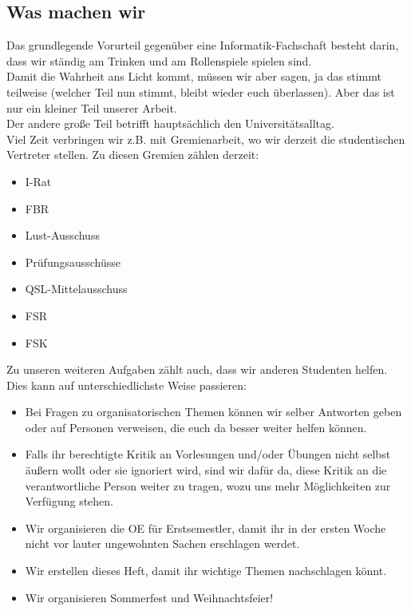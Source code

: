 \documentclass[12pt,a4paper]{scrartcl}
\begin{document}
	\subsection{Was machen wir}
		Das grundlegende Vorurteil gegenüber eine Informatik-Fachschaft besteht darin, dass wir ständig am Trinken und am Rollenspiele spielen sind. \\
		Damit die Wahrheit ans Licht kommt, müssen wir aber sagen, ja das stimmt teilweise (welcher Teil nun stimmt, bleibt wieder euch überlassen). Aber das ist nur ein kleiner Teil unserer Arbeit.\\
		Der andere große Teil betrifft hauptsächlich den Universitätsalltag.\\ Viel Zeit verbringen wir z.B. mit Gremienarbeit, wo wir derzeit die studentischen Vertreter stellen. Zu diesen Gremien zählen derzeit:
		\begin{itemize}
			\item I-Rat
			\item FBR
			\item Lust-Ausschuss
			\item Prüfungsausschüsse
			\item QSL-Mittelausschuss
			\item FSR
			\item FSK	
		\end{itemize}
		Zu unseren weiteren Aufgaben zählt auch, dass wir anderen Studenten helfen. Dies kann auf unterschiedlichste Weise passieren:
		\begin{itemize}
			\item Bei Fragen zu organisatorischen Themen können wir selber Antworten geben oder auf Personen verweisen, die euch da besser weiter helfen können.
			\item Falls ihr berechtigte Kritik an Vorlesungen und/oder Übungen nicht selbst äußern wollt oder sie ignoriert wird, sind wir dafür da, diese Kritik an die verantwortliche Person weiter zu tragen, wozu uns mehr Möglichkeiten zur Verfügung stehen.
			\item Wir organisieren die OE für Erstsemestler, damit ihr in der ersten Woche nicht vor lauter ungewohnten Sachen erschlagen werdet.
			\item Wir erstellen dieses Heft, damit ihr wichtige Themen nachschlagen könnt.
			\item Wir organisieren Sommerfest und Weihnachtsfeier!
		\end{itemize}
		
\end{document}
